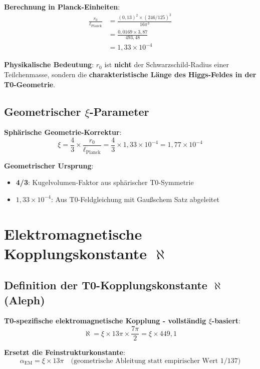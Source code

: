 \documentclass[12pt,a4paper]{article}
\newcommand{\xipar}{\xi}
\newcommand{\alphagem}{\alpha_{\text{EM}}}
\newcommand{\ellPlanck}{\ell_{\text{Planck}}}
\newcommand{\rzero}{r_0}
\begin{document}
	\textbf{Berechnung in Planck-Einheiten}:
	\begin{align}
		\frac{\rzero}{\ellPlanck} &= \frac{(0{,}13)^2 \times (246/125)^2}{16\pi^3} \\
		&= \frac{0{,}0169 \times 3{,}87}{493{,}48} \\
		&= 1{,}33 \times 10^{-4}
	\end{align}
	
	\textbf{Physikalische Bedeutung}: $\rzero$ ist \textbf{nicht} der Schwarzschild-Radius einer Teilchenmasse, sondern die \textbf{charakteristische L\"ange des Higgs-Feldes in der T0-Geometrie}.
	
	\subsection{Geometrischer $\xipar$-Parameter}
	
	\textbf{Sph\"arische Geometrie-Korrektur}:
	\begin{equation}
		\xipar = \frac{4}{3} \times \frac{\rzero}{\ellPlanck} = \frac{4}{3} \times 1{,}33 \times 10^{-4} = 1{,}77 \times 10^{-4}
	\end{equation}
	
	\textbf{Geometrischer Ursprung}:
	\begin{itemize}
		\item \textbf{4/3}: Kugelvolumen-Faktor aus sph\"arischer T0-Symmetrie
		\item \textbf{$1{,}33 \times 10^{-4}$}: Aus T0-Feldgleichung mit Gau\ss{}schem Satz abgeleitet
	\end{itemize}
	
	\section{Elektromagnetische Kopplungskonstante $\aleph$}
	
	\subsection{Definition der T0-Kopplungskonstante $\aleph$ (Aleph)}
	
	\textbf{T0-spezifische elektromagnetische Kopplung - vollst\"andig $\xipar$-basiert}:
	\begin{equation}
		\aleph = \xipar \times 13\pi \times \frac{7\pi}{2} = \xipar \times 449{,}1
	\end{equation}
	
	\textbf{Ersetzt die Feinstrukturkonstante}:
	\begin{equation}
		\alphagem = \xipar \times 13\pi \quad \text{(geometrische Ableitung statt empirischer Wert 1/137)}
	\end{equation}
	
\end{document}
